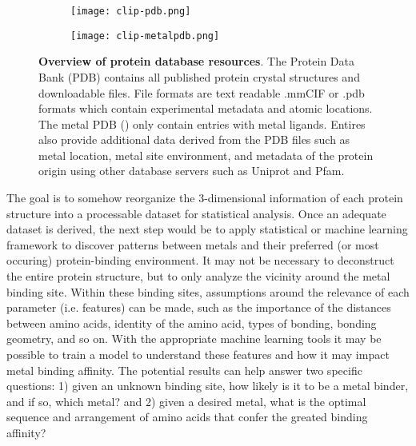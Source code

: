 \documentclass[../main/main]{subfiles}
\begin{document}
\begin{figure}[H]
	\centering
	\begin{subfigure}[h]{\columnwidth}
		\texttt{[image: clip-pdb.png]}
	\end{subfigure}
\end{figure}
%
\begin{figure}[H]\ContinuedFloat
	\centering
	\begin{subfigure}[h]{\columnwidth}
		\texttt{[image: clip-metalpdb.png]}
	\end{subfigure}
	\caption[Overview of protein database resources]
	{
		\textbf{Overview of protein database resources}.
		The Protein Data Bank (PDB) contains all published protein crystal structures and downloadable files. File formats are text readable .mmCIF or .pdb formats which contain experimental metadata and atomic locations. The metal PDB (\mPDB{}) only contain entries with metal ligands. Entires also provide additional data derived from the PDB files such as metal location, metal site environment, and metadata of the protein origin using other database servers such as Uniprot and Pfam.
	}
	\label{\figname{C}{1}}
\end{figure}

The goal is to somehow reorganize the 3-dimensional information of each protein structure into a processable dataset for statistical analysis. Once an adequate dataset is derived, the next step would be to apply statistical or machine learning framework to discover patterns between metals and their preferred (or most occuring) protein-binding environment. It may not be necessary to deconstruct the entire protein structure, but to only analyze the vicinity around the metal binding site. Within these binding sites, assumptions around the relevance of each parameter (i.e. features) can be made, such as the importance of the distances between amino acids, identity of the amino acid, types of bonding, bonding geometry, and so on. With the appropriate machine learning tools it may be possible to train a model to understand these features and how it may impact metal binding affinity. The potential results can help answer two specific questions: 1) given an unknown binding site, how likely is it to be a metal binder, and if so, which metal? and 2) given a desired metal, what is the optimal sequence and arrangement of amino acids that confer the greated binding affinity?

\end{document}
